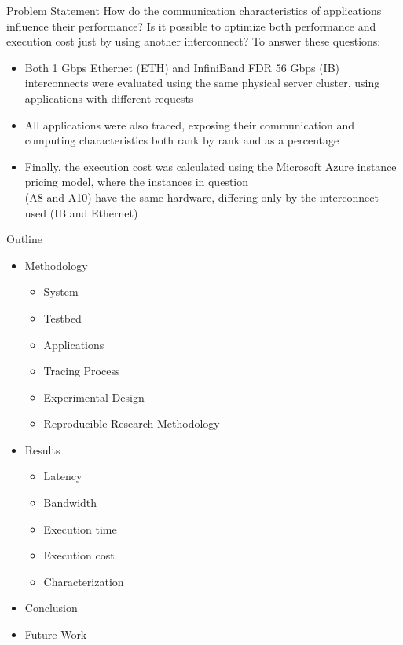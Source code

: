 \documentclass{beamer}
\begin{document}
\begin{frame}{Problem Statement}
How do the \alert{communication characteristics} of applications influence their \alert{performance}?
\pause \vfill
Is it possible to optimize both \alert{performance} and \alert{execution cost} just by using another interconnect?
\pause \vfill
To answer these questions:

\pause \vfill
\begin{itemize}
    \item Both \alert{1 Gbps Ethernet (ETH)} and \alert{InfiniBand FDR 56 Gbps (IB)} interconnects were evaluated using the same physical server cluster, using applications with different requests
\pause \vfill
    \item All applications were also \alert{traced}, exposing their communication and computing characteristics both rank by rank and as a percentage
\pause \vfill
    \item Finally, the \alert{execution cost} was calculated using the \alert{Microsoft Azure instance pricing model}, where the instances in question \\(A8 and A10) have the same hardware, differing only by the interconnect used (IB and Ethernet)
\end{itemize}
\vfill
    
\end{frame}
\begin{frame}{Outline}
\vfill
\Large
\begin{itemize}
\item Methodology
\begin{itemize}
\item System
\item Testbed
\item Applications
\item Tracing Process
\item Experimental Design
\item Reproducible Research Methodology
\end{itemize}
\end{itemize}
\begin{itemize}
\item Results
\begin{itemize}
    \item Latency
    \item Bandwidth
    \item Execution time
    \item Execution cost
    \item Characterization
\end{itemize}
\end{itemize}
\begin{itemize}
\item Conclusion
\item Future Work
\end{itemize}
\end{frame}
\end{document}
